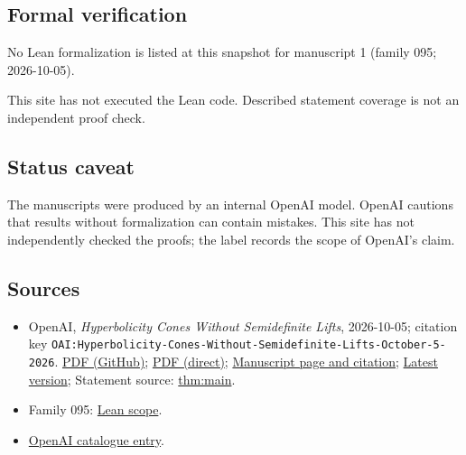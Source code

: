 \documentclass[11pt]{article}
\begin{document}
\subsection{Formal verification}
No Lean formalization is listed at this snapshot for manuscript 1 (family 095; 2026-10-05).

This site has not executed the Lean code. Described statement coverage is not an independent proof check.

\subsection{Status caveat}
The manuscripts were produced by an internal OpenAI model. OpenAI cautions that results without formalization can contain mistakes. This site has not independently checked the proofs; the label records the scope of OpenAI's claim.

\subsection{Sources}
\begin{itemize}
\item OpenAI, \emph{Hyperbolicity Cones Without Semidefinite Lifts}, 2026-10-05; citation key \texttt{OAI:Hyperbolicity-Cones-Without-Semidefinite-Lifts-October-5-2026}. \href{https://github.com/openai/math/blob/adc7f1241b42e322a6451854ab7e4b4c146bf78a/preprints/Hyperbolicity-Cones-Without-Semidefinite-Lifts-October-5-2026/nonliftable-hyperbolicity.pdf}{PDF (GitHub)}; \href{https://github.com/openai/math/raw/adc7f1241b42e322a6451854ab7e4b4c146bf78a/preprints/Hyperbolicity-Cones-Without-Semidefinite-Lifts-October-5-2026/nonliftable-hyperbolicity.pdf}{PDF (direct)}; \href{https://github.com/openai/math/blob/adc7f1241b42e322a6451854ab7e4b4c146bf78a/preprints/Hyperbolicity-Cones-Without-Semidefinite-Lifts-October-5-2026/README.md}{Manuscript page and citation}; \href{https://github.com/openai/math/blob/main/preprints/Hyperbolicity-Cones-Without-Semidefinite-Lifts-October-5-2026/nonliftable-hyperbolicity.pdf}{Latest version}; Statement source: \href{https://github.com/openai/math/blob/adc7f1241b42e322a6451854ab7e4b4c146bf78a/preprints/Hyperbolicity-Cones-Without-Semidefinite-Lifts-October-5-2026/build/source/01-introduction.tex\#L33}{thm:main}.
\item Family 095: \href{https://github.com/openai/math/blob/adc7f1241b42e322a6451854ab7e4b4c146bf78a/lean/docs/095.md}{Lean scope}.
\item \href{https://github.com/openai/math/blob/adc7f1241b42e322a6451854ab7e4b4c146bf78a/CONTENTS.md}{OpenAI catalogue entry}.
\end{itemize}
\end{document}
